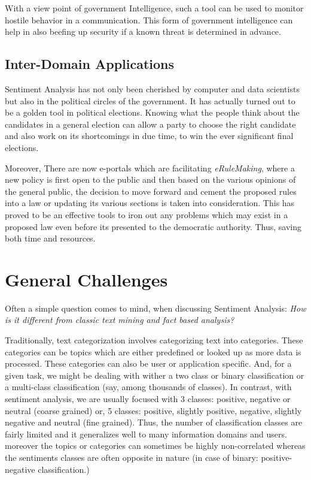 With a view point of government  Intelligence, such a tool can be used to monitor hostile behavior in a communication. This form of government intelligence can help in also beefing up security if a known threat is determined in advance.

\subsection{Inter-Domain Applications}
Sentiment Analysis has not only been cherished by computer and data scientists but also in the political circles of the government. It has actually turned out to be a golden tool in political elections. Knowing what the people think about the candidates in a general election can allow a party to choose the right candidate and also work on its shortcomings in due time, to win the ever significant final elections. 

Moreover, There are now e-portals which are facilitating \textit{eRuleMaking}, where a new policy is first open to the public and then based on the various opinions of the general public, the decision to move forward and cement the proposed rules into a law or updating its various sections is taken into consideration. This has proved to be an effective tools to iron out any problems which may exist in a proposed law even before its presented to the democratic authority. Thus, saving both time and resources.

\section{General Challenges}

Often a simple question comes to mind, when discussing Sentiment Analysis: \textit{How is it different from classic text mining and fact based analysis?}

Traditionally, text categorization involves categorizing text into categories. These categories can be topics which are either predefined or looked up as more data is processed. These categories can also be user or application specific. And, for a given task, we might be dealing with wither a two class or binary classification or a multi-class classification (say, among thousands of classes).   In contrast, with sentiment analysis, we are usually focused with 3 classes: positive, negative or neutral (coarse grained) or, 5 classes: positive, slightly positive, negative, slightly negative and neutral (fine grained).  Thus, the number of classification classes are fairly limited and it generalizes well to many information domains and users. moreover the topics or categories can sometimes be highly non-correlated whereas the sentiments classes are often opposite in nature (in case of binary: positive- negative classification.)

